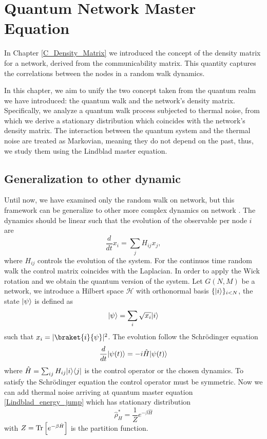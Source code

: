 \chapter{Quantum Network Master Equation}

In Chapter \ref{C_Density_Matrix} we introduced the concept of the density matrix for a network, derived from the communicability matrix. This quantity captures the correlations between the nodes in a random walk dynamics.

In this chapter, we aim to unify the two concept taken from the quantum realm we have introduced: the quantum walk and the network's density matrix.
Specifically, we analyze a quantum walk process subjected to thermal noise, from which we derive a stationary distribution which coincides with the network's density matrix. 
The interaction between the quantum system and the thermal noise are treated as Markovian, meaning they do not depend on the past, thus, we study them using the Lindblad master equation.






\section{Generalization to other dynamic}

Until now, we have examined only the random walk on network, but this framework can be generalize to other more complex dynamics on network \cite{De_Domenico_2023}.
The dynamics should be linear such that the evolution of the observable per node $i$ are 
\begin{equation}\label{general_dynamics}
    \frac{d}{dt} x_i = \sum_j H_{ij} x_j,
\end{equation}
where $H_{ij}$ controls the evolution of the system.
For the continuos time random walk the control matrix coincides with the Laplacian.
In order to apply the Wick rotation and we obtain the quantum version of the system.
Let $G(N,M)$ be a network, we introduce a Hilbert space $\mathcal{H}$ with orthonormal basis $\{\lvert i\rangle\}_{i<N}$, the state $\lvert\psi\rangle$ is defined as
\begin{equation}
    \lvert\psi\rangle= \sum_i\sqrt{x_i}\lvert i\rangle
\end{equation}
such that $x_i = |\braket{i}{\psi}|^2$.
The evolution follow the Schrödinger equation
\begin{equation}
    \frac{d}{dt}\lvert\psi(t)\rangle = -i\hat H\lvert\psi(t)\rangle
\end{equation}
where 
$\hat H = \sum_{ij} H_{ij} \lvert i\rangle\langle j\rvert$ is the control operator or the chosen dynamics. To satisfy the Schrödinger equation the control operator must be symmetric.
Now we can add thermal noise arriving at quantum master equation \eqref{Lindblad_energy_jump} which has stationary distribution 
\begin{equation}
    \hat\rho_H^*= \frac{1}{Z}e^{-\beta\hat H}
\end{equation}
with $Z= \operatorname{Tr}\left[e^{-\beta\hat H}\right]$ is the partition function.

